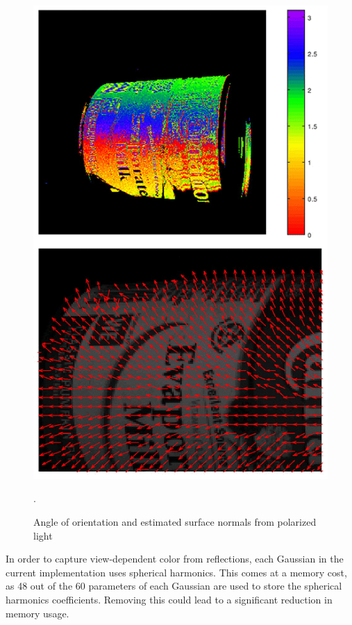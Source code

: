 \begin{figure}
    \centering
    \includegraphics[width=\linewidth]{images/polarization_normals.png}
    \caption{Angle of orientation and estimated surface normals from polarized light \cite{lucidvisionlabs3DDepthSurface2021}}.
    \label{fig:polarization}
\end{figure}


In order to capture view-dependent color from reflections, each Gaussian in the current implementation uses spherical harmonics.
This comes at a memory cost, as 48 out of the 60 parameters of each Gaussian are used to store the spherical harmonics coefficients.
Removing this could lead to a significant reduction in memory usage.


